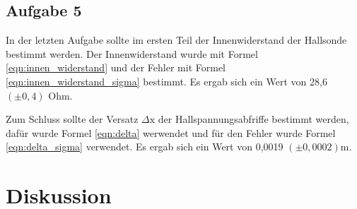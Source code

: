 \documentclass[12pt]{scrartcl}
\begin{document}
\newpage
\subsection{Aufgabe 5}
In der letzten Aufgabe sollte im ersten Teil der Innenwiderstand der Hallsonde bestimmt werden. Der Innenwiderstand wurde mit Formel \ref{eqn:innen_widerstand} und der Fehler mit Formel \ref{eqn:innen_widerstand_sigma} bestimmt. Es ergab sich ein Wert von 28,6 $(\pm 0,4)$ Ohm.

Zum Schluss sollte der Versatz $\Delta\text{x}$ der Hallspannungsabfriffe bestimmt werden, dafür wurde Formel \ref{eqn:delta} werwendet und für den Fehler wurde Formel \ref{eqn:delta_sigma} verwendet. Es ergab sich ein Wert von 0,0019 $(\pm 0,0002)$m.


\section{Diskussion}
\end{document}
